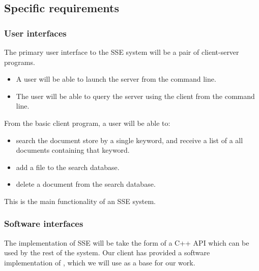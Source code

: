 \subsection{ Specific requirements } %


\subsubsection{ User interfaces }

The primary user interface to the SSE system will be a pair of client-server programs.
\begin{itemize}
\item A user will be able to launch the server from the command line.
\item The user will be able to query the server using the client from the command line. 
\end{itemize}

From the basic client program, a user will be able to:

\begin{itemize}
\item search the document store by a single keyword, and receive a list of a all documents containing that keyword. 
\item add a file to the search database.
\item delete a document from the search database.
\end{itemize}

This is the main functionality of an SSE system.


\subsubsection{ Software interfaces }

The implementation of SSE will be take the form of a C++ API which can be used by the rest of the system. 
Our client has provided a software implementation of \cite{yavuz15}, which we will use as a base for our work.

